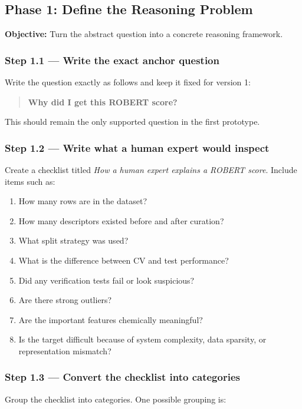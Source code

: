 \documentclass[11pt]{article}
\begin{document}
\subsection{Phase 1: Define the Reasoning Problem}
\textbf{Objective:} Turn the abstract question into a concrete reasoning framework.

\subsubsection*{Step 1.1 --- Write the exact anchor question}
Write the question exactly as follows and keep it fixed for version 1:

\begin{quote}
\textbf{Why did I get this ROBERT score?}
\end{quote}

This should remain the only supported question in the first prototype.

\subsubsection*{Step 1.2 --- Write what a human expert would inspect}
Create a checklist titled \textit{How a human expert explains a ROBERT score}. Include items such as:

\begin{enumerate}
    \item How many rows are in the dataset?
    \item How many descriptors existed before and after curation?
    \item What split strategy was used?
    \item What is the difference between CV and test performance?
    \item Did any verification tests fail or look suspicious?
    \item Are there strong outliers?
    \item Are the important features chemically meaningful?
    \item Is the target difficult because of system complexity, data sparsity, or representation mismatch?
\end{enumerate}

\subsubsection*{Step 1.3 --- Convert the checklist into categories}
Group the checklist into categories. One possible grouping is:
\end{document}
